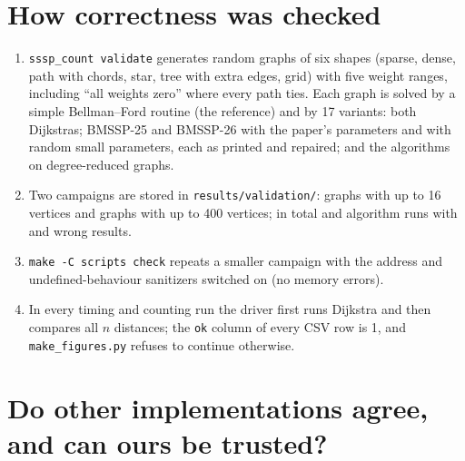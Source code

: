 \documentclass[11pt,a4paper]{article}
\newcommand{\code}[1]{\texttt{#1}}
\newcommand{\bmA}{BMSSP-25}
\newcommand{\bmB}{BMSSP-26}
\begin{document}
\section{How correctness was checked}
\begin{enumerate}
\item \code{sssp\_count validate} generates random graphs of six shapes (sparse, dense, path with chords, star, tree with extra edges, grid) with five weight ranges, including ``all weights zero'' where every path ties. Each graph is solved by a simple Bellman--Ford routine (the reference) and by 17 variants: both Dijkstras; \bmA{} and \bmB{} with the paper's parameters and with random small parameters, each as printed and repaired; and the algorithms on degree-reduced graphs.
\item Two campaigns are stored in \code{results/validation/}: \ValSmallTrials{} graphs with up to 16 vertices and \ValMediumTrials{} graphs with up to 400 vertices; in total \ValSmallRuns{} and \ValMediumRuns{} algorithm runs with \ValSmallWrong{} and \ValMediumWrong{} wrong results.
\item \code{make -C scripts check} repeats a smaller campaign with the address and undefined-behaviour sanitizers switched on (no memory errors).
\item In every timing and counting run the driver first runs Dijkstra and then compares all $n$ distances; the \code{ok} column of every CSV row is 1, and \code{make\_figures.py} refuses to continue otherwise.
\end{enumerate}



\section{Do other implementations agree, and can ours be trusted?}\label{sec:others}
\end{document}

